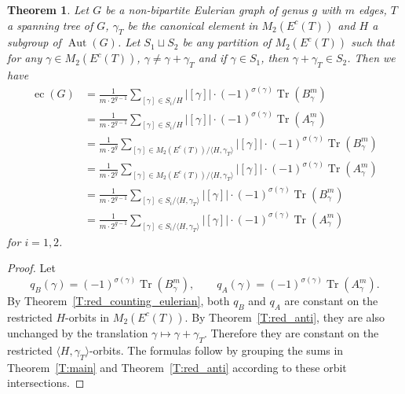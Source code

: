 \documentclass[11pt]{amsart}
\theoremstyle{plain}
\newtheorem{theorem}{Theorem}[section]
\theoremstyle{definition}
\DeclareMathOperator{\ec}{\operatorname{ec}}
\DeclareMathOperator{\trace}{\operatorname{Tr}}
\DeclareMathOperator{\Aut}{\operatorname{Aut}}
\numberwithin{equation}{section}
\begin{document}
\begin{theorem}\label{T:red_counting_eulerian_combined}
Let $G$ be a non-bipartite Eulerian graph of genus $g$ with $m$ edges, $T$ a spanning tree of $G$,  $\gamma_T$ be the canonical element in $M_2(E^c(T) )$ and $H$ a subgroup of $\Aut(G)$. Let $S_1\sqcup S_2$ be any partition of $M_2(E^c(T) )$ such that for any  $\gamma\in M_2(E^c(T) )$, $\gamma\neq \gamma+\gamma_T$ and if $\gamma\in S_1$, then $\gamma+\gamma_T\in S_2$. Then we have
\begin{align*}
\ec(G) &= \frac{1}{m\cdot 2^{g-1}}\sum_{[\gamma]\in S_i/H}|[\gamma]|\cdot(-1)^{\sigma(\gamma)}\trace\left(B_\gamma^m\right) \\
&= \frac{1}{m\cdot 2^{g-1}}\sum_{[\gamma]\in S_i/H}|[\gamma]|\cdot(-1)^{\sigma(\gamma)}\trace\left(A_\gamma^m\right) \\
&=  \frac{1}{m\cdot 2^g}\sum_{[\gamma]\in M_2(E^c(T))/\langle H,\gamma_T\rangle}|[\gamma]|\cdot(-1)^{\sigma(\gamma)}\trace\left(B_\gamma^m\right) \\
&= \frac{1}{m\cdot 2^g}\sum_{[\gamma]\in M_2(E^c(T))/\langle H,\gamma_T\rangle}|[\gamma]|\cdot(-1)^{\sigma(\gamma)}\trace\left(A_{\gamma}^m\right) \\
&=  \frac{1}{m\cdot 2^{g-1}}\sum_{[\gamma]\in S_i/\langle H,\gamma_T\rangle}|[\gamma]|\cdot(-1)^{\sigma(\gamma)}\trace\left(B_\gamma^m\right) \\
&= \frac{1}{m\cdot 2^{g-1}}\sum_{[\gamma]\in S_i/\langle H,\gamma_T\rangle}|[\gamma]|\cdot(-1)^{\sigma(\gamma)}\trace\left(A_{\gamma}^m\right)
\end{align*}
for $i=1,2$. 
\end{theorem}
\begin{proof}
Let
$$
q_B(\gamma)=(-1)^{\sigma(\gamma)}\trace(B_\gamma^m),\qquad
q_A(\gamma)=(-1)^{\sigma(\gamma)}\trace(A_\gamma^m).
$$
By Theorem~\ref{T:red_counting_eulerian}, both $q_B$ and $q_A$ are constant on the restricted $H$-orbits in $M_2(E^c(T))$. By Theorem~\ref{T:red_anti}, they are also unchanged by the translation $\gamma\mapsto \gamma+\gamma_T$. Therefore they are constant on the restricted $\langle H,\gamma_T\rangle$-orbits. The formulas follow by grouping the sums in Theorem~\ref{T:main} and Theorem~\ref{T:red_anti} according to these orbit intersections. 

\end{proof}
\end{document}
